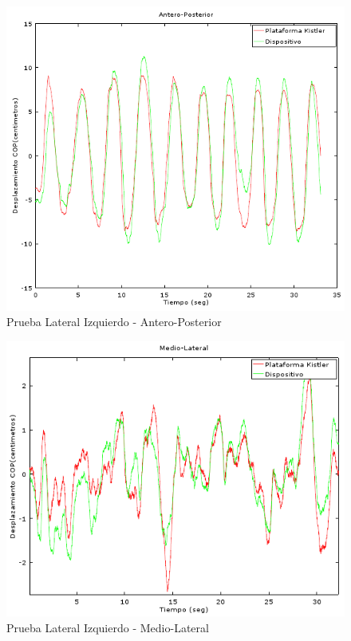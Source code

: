 \documentclass[12pt,a4paper]{article}
\begin{document}
	\begin{figure}[H]
		\centering
		\includegraphics[width=1\linewidth]{images/pruebas/LateralIzquierdo/Antero-Posterior}
		\caption{Prueba Lateral Izquierdo - Antero-Posterior}
		\label{fig:anteroPosteriorLateral}
	\end{figure}
	\begin{figure}[H]
		\centering
		\includegraphics[width=1\linewidth]{images/pruebas/LateralIzquierdo/Medio-Lateral}
		\caption{Prueba Lateral Izquierdo - Medio-Lateral}
		\label{fig:medioLateralIzquierdo}	
	\end{figure}
	
\end{document}
